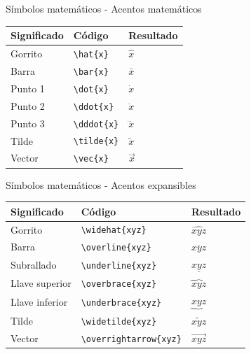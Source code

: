 \documentclass[
  ignorenonframetext,
  aspectratio=169]{beamer}
\begin{document}
\begin{frame}[fragile]{Símbolos matemáticos - Acentos matemáticos}
\protect\hypertarget{suxedmbolos-matemuxe1ticos---acentos-matemuxe1ticos}{}
\begin{longtable}[]{@{}lll@{}}
\toprule()
Significado & Código & Resultado \\
\midrule()
\endhead
Gorrito & \texttt{\textbackslash{}hat\{x\}} & \(\hat{x}\) \\
Barra & \texttt{\textbackslash{}bar\{x\}} & \(\bar{x}\) \\
Punto 1 & \texttt{\textbackslash{}dot\{x\}} & \(\dot{x}\) \\
Punto 2 & \texttt{\textbackslash{}ddot\{x\}} & \(\ddot{x}\) \\
Punto 3 & \texttt{\textbackslash{}dddot\{x\}} & \(\dddot{x}\) \\
Tilde & \texttt{\textbackslash{}tilde\{x\}} & \(\tilde{x}\) \\
Vector & \texttt{\textbackslash{}vec\{x\}} & \(\vec{x}\) \\
\bottomrule()
\end{longtable}
\end{frame}

\begin{frame}[fragile]{Símbolos matemáticos - Acentos expansibles}
\protect\hypertarget{suxedmbolos-matemuxe1ticos---acentos-expansibles}{}
\begin{longtable}[]{@{}lll@{}}
\toprule()
Significado & Código & Resultado \\
\midrule()
\endhead
Gorrito & \texttt{\textbackslash{}widehat\{xyz\}} & \(\widehat{xyz}\) \\
Barra & \texttt{\textbackslash{}overline\{xyz\}} & \(\overline{xyz}\) \\
Subrallado & \texttt{\textbackslash{}underline\{xyz\}} &
\(\underline{xyz}\) \\
Llave superior & \texttt{\textbackslash{}overbrace\{xyz\}} &
\(\overbrace{xyz}\) \\
Llave inferior & \texttt{\textbackslash{}underbrace\{xyz\}} &
\(\underbrace{xyz}\) \\
Tilde & \texttt{\textbackslash{}widetilde\{xyz\}} &
\(\widetilde{xyz}\) \\
Vector & \texttt{\textbackslash{}overrightarrow\{xyz\}} &
\(\overrightarrow{xyz}\) \\
\bottomrule()
\end{longtable}
\end{frame}
\end{document}

